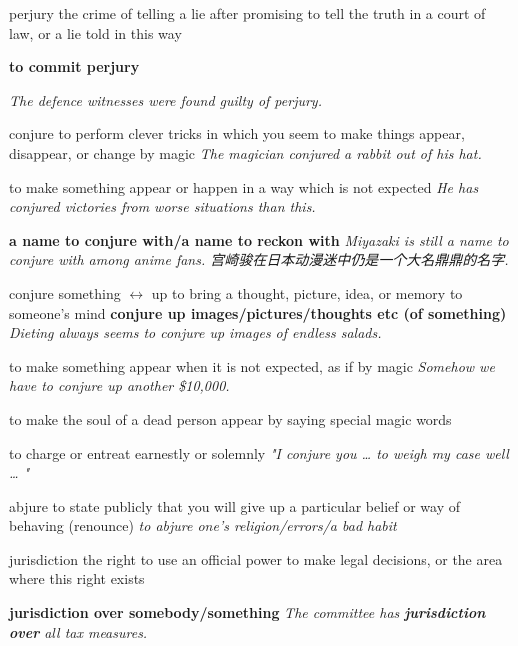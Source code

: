 \begin{DefWord}{perjury}
    the crime of telling a lie after promising to tell the truth in a court of law, or a lie told in this way

    \textbf{to commit perjury}

    \textit{The defence witnesses were found guilty of perjury.}
\end{DefWord}


\begin{DefWord}{conjure}
    to perform clever tricks in which you seem to make things appear, disappear, or change by magic
    \textit{The magician conjured a rabbit out of his hat.}

    to make something appear or happen in a way which is not expected
    \textit{He has conjured victories from worse situations than this.}

    \textbf{a name to conjure with/a name to reckon with}
    \textit{Miyazaki is still a name to conjure with among anime fans. 宫崎骏在日本动漫迷中仍是一个大名鼎鼎的名字.}

    conjure something $\leftrightarrow$ up
    to bring a thought, picture, idea, or memory to someone's mind
    \textbf{conjure up images/pictures/thoughts etc (of something)}
    \textit{Dieting always seems to conjure up images of endless salads.}

    to make something appear when it is not expected, as if by magic
    \textit{Somehow we have to conjure up another \$10,000.}

    to make the soul of a dead person appear by saying special magic words

    to charge or entreat earnestly or solemnly
    \textit{"I conjure you … to weigh my case well … "}
\end{DefWord}

\begin{DefWord}{abjure}
    to state publicly that you will give up a particular belief or way of behaving (renounce)
    \textit{to abjure one's religion/errors/a bad habit}
\end{DefWord}


\begin{DefWord}{jurisdiction}
    the right to use an official power to make legal decisions, or the area where this right exists

    \textbf{jurisdiction over somebody/something}
    \textit{The committee has \textbf{jurisdiction over} all tax measures.}

\end{DefWord}





